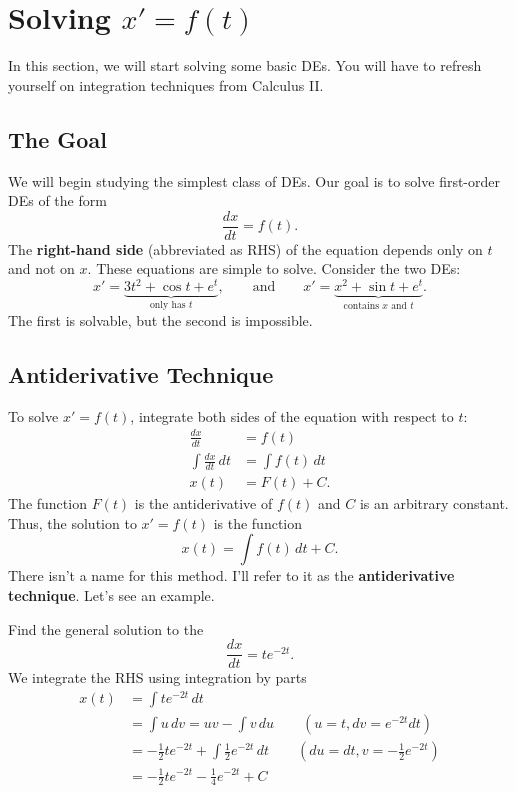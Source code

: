 \documentclass[11pt,letterpaper]{article}
\begin{document}
\section{Solving $x'=f(t)$}

In this section, we will start solving some basic DEs. You will have to refresh yourself on integration techniques from Calculus II.

\subsection{The Goal}
We will begin studying the simplest class of DEs.
Our goal is to solve first-order DEs of the form
\[
\frac{dx}{dt} = f(t).
\]
The \textbf{right-hand side} (abbreviated as RHS) of the equation depends only on $t$ and not on $x$. These equations are simple to solve. Consider the two DEs:
\[
x' = \underbrace{3t^2+\cos t+e^t}_{\text{only has }t}, 
\qquad \text{and}\qquad
x' = \underbrace{x^2+\sin t+e^t}_{\text{contains } x\text{ and }t}.
\]
The first is solvable, but the second is impossible.

\subsection{Antiderivative Technique}
To solve $x'=f(t)$, integrate both sides of the equation with respect to $t$:
\begin{align*}
    \frac{dx}{dt} &= f(t)\\
    \int\frac{dx}{dt} \,dt&= \int f(t) \,dt \\
    x(t)&= F(t) +C.
\end{align*}
The function $F(t)$ is the antiderivative of $f(t)$ and $C$ is an arbitrary constant.
Thus, the solution to $x'=f(t)$ is the function
\[
x(t) = \int f(t)\,dt + C.
\]
There isn't a name for this method. I'll refer to it as the \textbf{antiderivative technique}. Let's see an example.

\begin{example}[2]{
Find the general solution to the 
\[
\frac{dx}{dt} = t e^{-2t}.
\]
}
We integrate the RHS using integration by parts 
\begin{align*}    
x(t) &= \int t e^{-2t}\,dt\\ 
    &=\int u\,dv = uv - \int v\,du \qquad (u=t,dv =e^{-2t}dt)\\
    &=-\tfrac12 t e^{-2t} + \int\tfrac12 e^{-2t}\,dt \qquad (du=dt,v =-\tfrac{1}{2}e^{-2t})\\
    &=\boxed{-\tfrac12 t e^{-2t} - \tfrac14 e^{-2t} + C} 
\end{align*}
\end{example}
\end{document}
